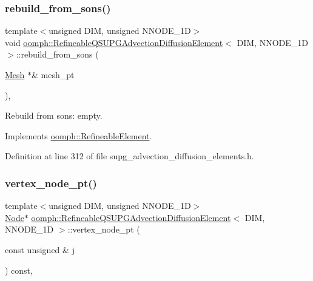 \subsubsection{\texorpdfstring{rebuild\+\_\+from\+\_\+sons()}{rebuild\_from\_sons()}}
{\footnotesize\ttfamily template$<$unsigned D\+IM, unsigned N\+N\+O\+D\+E\+\_\+1D$>$ \\
void \hyperlink{classoomph_1_1RefineableQSUPGAdvectionDiffusionElement}{oomph\+::\+Refineable\+Q\+S\+U\+P\+G\+Advection\+Diffusion\+Element}$<$ D\+IM, N\+N\+O\+D\+E\+\_\+1D $>$\+::rebuild\+\_\+from\+\_\+sons (\begin{DoxyParamCaption}\item[{\hyperlink{classoomph_1_1Mesh}{Mesh} $\ast$\&}]{mesh\+\_\+pt }\end{DoxyParamCaption})\hspace{0.3cm}{\ttfamily [inline]}, {\ttfamily [virtual]}}



Rebuild from sons\+: empty. 



Implements \hyperlink{classoomph_1_1RefineableElement_a33324be27833fa4b78279d17158215fa}{oomph\+::\+Refineable\+Element}.



Definition at line 312 of file supg\+\_\+advection\+\_\+diffusion\+\_\+elements.\+h.

\mbox{\label{classoomph_1_1RefineableQSUPGAdvectionDiffusionElement_ab7a06dc6cb7993c7a42f3c52ea4a01b3}} 
\subsubsection{\texorpdfstring{vertex\+\_\+node\+\_\+pt()}{vertex\_node\_pt()}}
{\footnotesize\ttfamily template$<$unsigned D\+IM, unsigned N\+N\+O\+D\+E\+\_\+1D$>$ \\
\hyperlink{classoomph_1_1Node}{Node}$\ast$ \hyperlink{classoomph_1_1RefineableQSUPGAdvectionDiffusionElement}{oomph\+::\+Refineable\+Q\+S\+U\+P\+G\+Advection\+Diffusion\+Element}$<$ D\+IM, N\+N\+O\+D\+E\+\_\+1D $>$\+::vertex\+\_\+node\+\_\+pt (\begin{DoxyParamCaption}\item[{const unsigned \&}]{j }\end{DoxyParamCaption}) const\hspace{0.3cm}{\ttfamily [inline]}, {\ttfamily [virtual]}}



